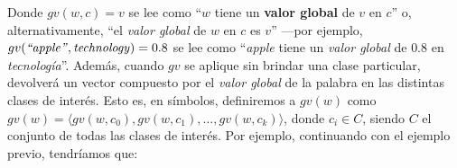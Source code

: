 


Donde $gv(w, c) = v$ se lee como ``$w$ tiene un \textbf{valor global} de $v$ en $c$'' o, alternativamente, ``el \emph{valor global} de $w$ en $c$ es $v$'' ---por ejemplo, $gv(\text{\emph{``apple''}}, \text{\emph{technology}}) = 0.8$ se lee como ``\emph{apple} tiene un \emph{valor global} de $0.8$ en \emph{tecnología}''.
Además, cuando $gv$ se aplique sin brindar una clase particular, devolverá un vector compuesto por el \emph{valor global} de la palabra en las distintas clases de interés.
Esto es, en símbolos, definiremos a $gv(w)$ como $gv(w)=\langle gv(w,c_0), gv(w,c_1), \dots, gv(w,c_k)\rangle$, donde $c_i \in C$, siendo $C$ el conjunto de todas las clases de interés.
Por ejemplo, continuando con el ejemplo previo, tendríamos que:


